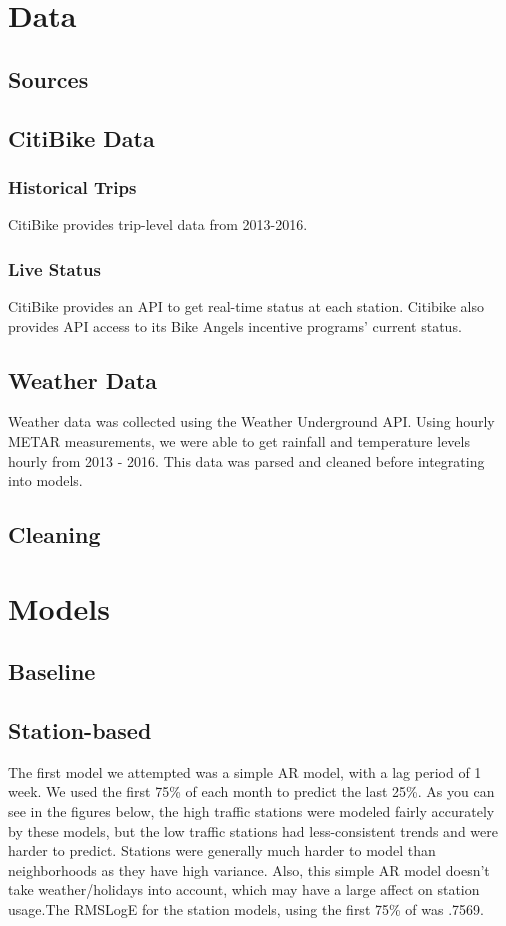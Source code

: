 \documentclass{proc}
\begin{document}
\section{Data}
\subsection{Sources}

\subsection{CitiBike Data}

\subsubsection{Historical Trips}
CitiBike provides trip-level data from 2013-2016.

\subsubsection{Live Status}
CitiBike provides an API to get real-time status at each station. Citibike also provides API access to its Bike Angels incentive programs' current status.

\subsection{Weather Data}

Weather data was collected using the Weather Underground API. Using hourly METAR measurements, we were able to get rainfall and temperature levels hourly from 2013 - 2016. This data was parsed and cleaned before integrating into models.



\subsection{Cleaning}


\section{Models}


\subsection{Baseline}

\subsection{Station-based}
The first model we attempted was a simple AR model, with a lag period of 1 week. We used the first 75\% of each month to predict the last 25\%. As you can see in the figures below, the high traffic stations were modeled fairly accurately by these models, but the low traffic stations had less-consistent trends and were harder to predict. Stations were generally much harder to model than neighborhoods as they have high variance. Also, this simple AR model doesn't take weather/holidays into account, which may have a large affect on station usage.The RMSLogE for the station models, using the first 75\% of  was .7569. 
\end{document}
